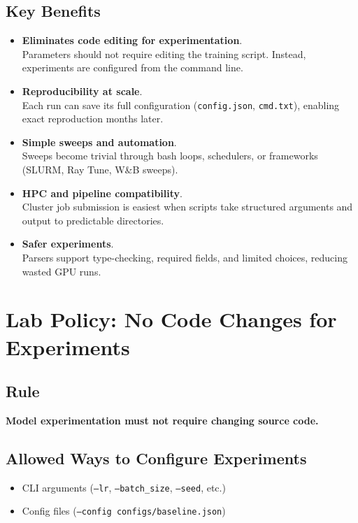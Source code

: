 \documentclass[11pt]{article}
\begin{document}
\subsection{Key Benefits}
\begin{itemize}
    \item \textbf{\small Eliminates code editing for experimentation}.\\
    Parameters should not require editing the training script. Instead, experiments are configured from the command line.

    \item \textbf{Reproducibility at scale}.\\
    Each run can save its full configuration (\texttt{config.json}, \texttt{cmd.txt}), enabling exact reproduction months later.

    \item \textbf{Simple sweeps and automation}.\\
    Sweeps become trivial through bash loops, schedulers, or frameworks (SLURM, Ray Tune, W\&B sweeps).

    \item \textbf{HPC and pipeline compatibility}.\\
    Cluster job submission is easiest when scripts take structured arguments and output to predictable directories.

    \item \textbf{Safer experiments}.\\
    Parsers support type-checking, required fields, and limited choices, reducing wasted GPU runs.
\end{itemize}

\section{Lab Policy: No Code Changes for Experiments}

\subsection{Rule}
\textbf{Model experimentation must not require changing source code.}

\subsection{Allowed Ways to Configure Experiments}
\begin{itemize}
    \item CLI arguments (\texttt{--lr}, \texttt{--batch\_size}, \texttt{--seed}, etc.)
    \item Config files (\texttt{--config configs/baseline.json})
\end{itemize}
\end{document}

